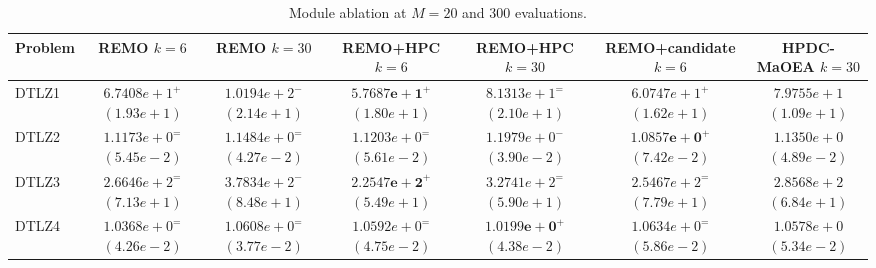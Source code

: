 \begin{table}[t]
\centering
\caption{Module ablation at $M=20$ and 300 evaluations.}
\label{tab:exp:abl20}
\scriptsize
\setlength{\tabcolsep}{4pt}
\renewcommand{\arraystretch}{1.12}
\begin{tabular}{lcccccc}
\toprule
Problem & \shortstack{REMO\\$k=6$} & \shortstack{REMO\\$k=30$} & \shortstack{REMO+HPC\\$k=6$} & \shortstack{REMO+HPC\\$k=30$} & \shortstack{REMO+candidate\\$k=6$} & \shortstack{HPDC-MaOEA\\$k=30$} \\
\midrule
DTLZ1 & \shortstack{$6.7408e+1^{+}$\\$(1.93e+1)$} & \shortstack{$1.0194e+2^{-}$\\$(2.14e+1)$} & \shortstack{$\mathbf{5.7687e+1}^{+}$\\$(1.80e+1)$} & \shortstack{$8.1313e+1^{=}$\\$(2.10e+1)$} & \shortstack{$6.0747e+1^{+}$\\$(1.62e+1)$} & \shortstack{$7.9755e+1$\\$(1.09e+1)$} \\
DTLZ2 & \shortstack{$1.1173e+0^{=}$\\$(5.45e-2)$} & \shortstack{$1.1484e+0^{=}$\\$(4.27e-2)$} & \shortstack{$1.1203e+0^{=}$\\$(5.61e-2)$} & \shortstack{$1.1979e+0^{-}$\\$(3.90e-2)$} & \shortstack{$\mathbf{1.0857e+0}^{+}$\\$(7.42e-2)$} & \shortstack{$1.1350e+0$\\$(4.89e-2)$} \\
DTLZ3 & \shortstack{$2.6646e+2^{=}$\\$(7.13e+1)$} & \shortstack{$3.7834e+2^{-}$\\$(8.48e+1)$} & \shortstack{$\mathbf{2.2547e+2}^{+}$\\$(5.49e+1)$} & \shortstack{$3.2741e+2^{=}$\\$(5.90e+1)$} & \shortstack{$2.5467e+2^{=}$\\$(7.79e+1)$} & \shortstack{$2.8568e+2$\\$(6.84e+1)$} \\
DTLZ4 & \shortstack{$1.0368e+0^{=}$\\$(4.26e-2)$} & \shortstack{$1.0608e+0^{=}$\\$(3.77e-2)$} & \shortstack{$1.0592e+0^{=}$\\$(4.75e-2)$} & \shortstack{$\mathbf{1.0199e+0}^{+}$\\$(4.38e-2)$} & \shortstack{$1.0634e+0^{=}$\\$(5.86e-2)$} & \shortstack{$1.0578e+0$\\$(5.34e-2)$} \\

\end{tabular}
\end{table}

